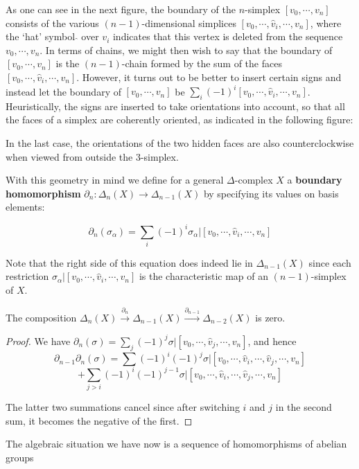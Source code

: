 As one can see in the next figure, the boundary of the $n$-simplex $[v_0, \cdots, v_n]$ consists of the various $(n-1)$-dimensional simplices $[v_0, \cdots, \hat{v}_i, \cdots, v_n]$, where the `hat'
symbol $\hat{}$ over $v_i$ indicates that this vertex is deleted from the sequence $v_0, \cdots, v_n$.
In terms of chains, we might then wish to say that the boundary of $[v_0, \cdots, v_n]$ is the
$(n-1)$-chain formed by the sum of the faces $[v_0, \cdots, \hat{v}_i, \cdots, v_n]$. However, it turns
out to be better to insert certain signs and instead let the boundary of $[v_0, \cdots, v_n]$ be
$\sum_i (-1)^i [v_0, \cdots, \hat{v}_i, \cdots, v_n]$. Heuristically, the signs are inserted to take orientations
into account, so that all the faces of a simplex are coherently oriented, as indicated in
the following figure:



In the last case, the orientations of the two hidden faces are also counterclockwise
when viewed from outside the 3-simplex.

With this geometry in mind we define for a general $\Delta$-complex $X$ a \textbf{boundary
homomorphism} $\partial_n : \Delta_n(X) \to \Delta_{n-1}(X)$ by specifying its values on basis elements:

$$\partial_n(\sigma_\alpha) = \sum_i (-1)^i \sigma_\alpha |[v_0, \cdots, \hat{v}_i, \cdots, v_n]$$

Note that the right side of this equation does indeed lie in $\Delta_{n-1}(X)$ since each restriction $\sigma_\alpha |[v_0, \cdots, \hat{v}_i, \cdots, v_n]$ is the characteristic map of an $(n-1)$-simplex of $X$.

\begin{lemma}
\label{lem:boundary-composition-zero}
\uses{}
The composition $\Delta_n(X) \xrightarrow{\partial_n} \Delta_{n-1}(X) \xrightarrow{\partial_{n-1}} \Delta_{n-2}(X)$ is zero.
\end{lemma}
\begin{proof}
 We have $\partial_n(\sigma) = \sum_j (-1)^j \sigma|[v_0, \cdots, \hat{v}_j, \cdots, v_n]$, and hence
$$\partial_{n-1} \partial_n(\sigma) = \sum (-1)^i (-1)^j \sigma|[v_0, \cdots, \hat{v}_i, \cdots, \hat{v}_j, \cdots, v_n]$$
$$+ \sum_{j > i} (-1)^i(-1)^{j-1}\sigma|[v_0, \cdots, \hat{v}_i, \cdots, \hat{v}_j, \cdots, v_n]$$

The latter two summations cancel since after switching $i$ and $j$ in the second sum, it
becomes the negative of the first.
\end{proof}
The algebraic situation we have now is a sequence of homomorphisms of abelian
groups

